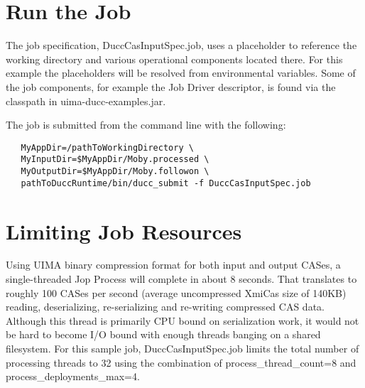 \section{Run the Job}
The job specification, DuccCasInputSpec.job, uses a placeholder to reference the working directory
and various operational components located there. For this example the placeholders will be resolved
from environmental variables. Some of the job components, for example
the Job Driver descriptor, is found via the classpath in uima-ducc-examples.jar.

The job is submitted from the command line with the following:
\begin{verbatim}
   MyAppDir=/pathToWorkingDirectory \
   MyInputDir=$MyAppDir/Moby.processed \ 
   MyOutputDir=$MyAppDir/Moby.followon \
   pathToDuccRuntime/bin/ducc_submit -f DuccCasInputSpec.job
\end{verbatim}

\section{Limiting Job Resources}
Using UIMA binary compression format for both input and output CASes, a single-threaded Jop Process will complete in about 8 seconds. That translates to roughly 100 CASes per second (average uncompressed XmiCas size of 140KB) reading, deserializing, re-serializing and re-writing compressed CAS data.
Although this thread is primarily CPU bound on serialization work, it would not be hard to become I/O bound with enough threads banging on a shared filesystem. For this sample job, DuccCasInputSpec.job limits the total number of processing threads to 32 using the combination of process\_thread\_count=8 and process\_deployments\_max=4.


